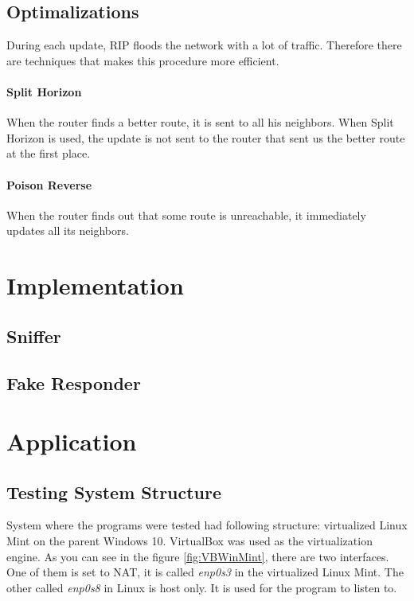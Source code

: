 \documentclass[10pt,a4paper,titlepage]{article}
\begin{document}
        \subsection{Optimalizations}
            During each update, RIP floods the network with a lot of traffic. Therefore there are techniques that makes this procedure
            more efficient.
            \paragraph{Split Horizon}
                When the router finds a better route, it is sent to all his neighbors. When Split Horizon is used, the update is
                not sent to the router that sent us the better route at the first place.
            \paragraph{Poison Reverse} 
                When the router finds out that some route is unreachable, it immediately updates all its neighbors. \cite{RIPJuniper}
                \cite{RIPGuide} \cite{RIPWikipedia} \cite{computernetworking} \cite{mistrovstvivsitich}
    
    \newpage
    \section{Implementation}

        \subsection{Sniffer}
        
            
        \subsection{Fake Responder}
        
    
    
    \section{Application}
        
        \subsection{Testing System Structure}
            System where the programs were tested had following structure: virtualized Linux Mint on the parent Windows 10. VirtualBox
            was used as the virtualization engine. As you can see in the figure \ref{fig:VBWinMint}, there are two interfaces. One of them
            is set to NAT, it is called {\it enp0s3} in the virtualized Linux Mint. The other called {\it enp0s8} in Linux is host only.
            It is used for the program to listen to.
\end{document}
